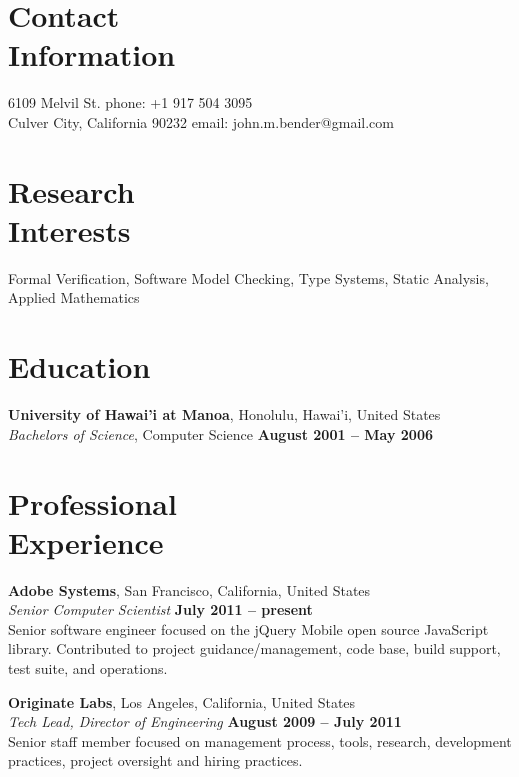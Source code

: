 \documentclass[margin,line]{resume}
\begin{document}
\begin{resume}

  \section{\mysidestyle Contact\\Information}

  6109 Melvil St.                       \hfill phone: +1 917 504 3095\\
  Culver City, California 90232         \hfill email: john.m.bender@gmail.com

  \section{\mysidestyle Research\\Interests}

  Formal Verification, Software Model Checking, Type Systems, Static Analysis, Applied Mathematics

  \section{\mysidestyle Education}

  \textbf{University of Hawai'i at Manoa}, Honolulu, Hawai'i, United States \vspace{2mm}\\
  \textsl{Bachelors of Science}, Computer Science \hfill \textbf{ August 2001 -- May 2006}\vspace{-3mm}\\

  \section{\mysidestyle Professional\\Experience}

  \textbf{Adobe Systems}, San Francisco, California, United States \vspace{1mm}\\
  \textsl{Senior Computer Scientist} \hfill \textbf{July 2011 -- present}\\
  Senior software engineer focused on the jQuery Mobile open source JavaScript library. Contributed to project guidance/management, code base, build support, test suite, and operations.

  \textbf{Originate Labs}, Los Angeles, California, United States \vspace{1mm}\\
  \textsl{Tech Lead, Director of Engineering} \hfill \textbf{August 2009 -- July 2011}\\
  Senior staff member focused on management process, tools, research, development practices, project oversight and hiring practices.


\end{resume}
\end{document}
